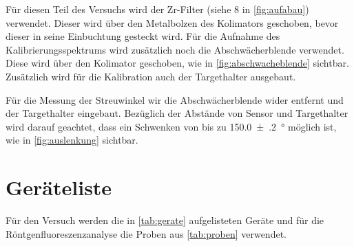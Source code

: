 \documentclass[12pt,english,ngerman]{scrartcl}
\begin{document}
Für diesen Teil des Versuchs wird der Zr-Filter (siehe 8 in \autoref{fig:aufabau}) verwendet.
Dieser wird über den Metalbolzen des Kolimators geschoben, bevor dieser in seine Einbuchtung gesteckt wird.
Für die Aufnahme des Kalibrierungsspektrums wird zusätzlich noch die Abschwächerblende verwendet. Diese wird 
über den Kolimator geschoben, wie in \autoref{fig:abschwacheblende} sichtbar. Zusätzlich wird für
die Kalibration auch der Targethalter ausgebaut.


\begin{figure}[H]
	\centering
	 \hfill
\end{figure}


Für die Messung der Streuwinkel wir die Abschwächerblende wider entfernt und der Targethalter eingebaut. 
Bezüglich der Abstände von Sensor und Targethalter wird darauf geachtet, dass ein Schwenken von bis zu 
\SI{150.0(2)}{\degree} möglich ist, wie in \autoref{fig:auslenkung} sichtbar.


\section{Geräteliste}\label{sec:geraeteliste}



Für den Versuch werden die in \autoref{tab:gerate} aufgelisteten
Geräte und für die Röntgenfluoreszenzanalyse die Proben aus \autoref{tab:proben} verwendet.
\end{document}
